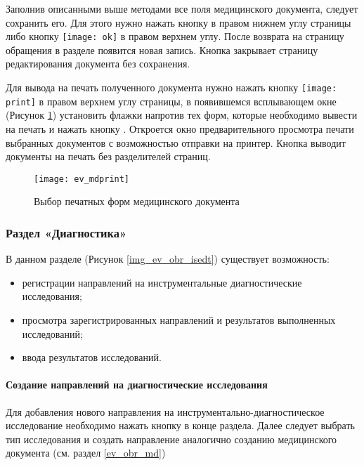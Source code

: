 Заполнив описанными выше методами все поля медицинского документа, следует сохранить его. Для этого нужно нажать кнопку  в правом нижнем углу страницы либо кнопку \texttt{[image: ok]} в правом верхнем углу. После возврата на страницу обращения в разделе  появится новая запись. Кнопка  закрывает страницу редактирования документа без сохранения.

Для вывода на печать полученного документа нужно нажать кнопку \texttt{[image: print]} в правом верхнем углу страницы, в появившемся всплывающем окне (Рисунок \ref{img_ev_mdpirnt}) установить флажки напротив тех форм, которые необходимо вывести на печать и нажать кнопку . Откроется окно предварительного просмотра печати выбранных документов с возможностью отправки на принтер. Кнопка  выводит документы на печать без разделителей страниц.

 \begin{figure}[ht]\centering
   \texttt{[image: ev\_mdprint]}
   \caption{Выбор печатных форм медицинского документа}
   \label{img_ev_mdpirnt}
 \end{figure}
 

\subsubsection{Раздел «Диагностика»} \label{ev_obr_is}

В данном разделе (Рисунок \ref{img_ev_obr_isedt}) существует возможность:
\begin{itemize}
 \item регистрации направлений на инструментальные диагностические исследования;
 \item просмотра зарегистрированных направлений и результатов выполненных исследований;
 \item ввода результатов исследований.
\end{itemize}
 
\paragraph{Создание направлений на диагностические исследования}

Для добавления нового направления на инструментально-диагностическое исследование необходимо нажать кнопку   в конце раздела. Далее следует выбрать тип исследования и создать направление аналогично созданию медицинского документа (см. раздел \ref{ev_obr_md})

